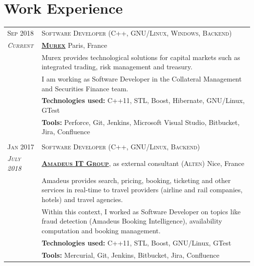 \documentclass[a4paper,10pt]{article}
\begin{document}
	\vspace{-5mm}

	\section{Work Experience}
	\begin{tabular}{p{1.7cm}|p{14.5cm}}
		\centering\textsc{Sep 2018} &
		\textsc{Software Developer (C++, GNU/Linux, Windows, Backend)} \\
		\centering\emph{\textsc{Current}} &
		\textsc{\textbf{\href{http://www.amadeus.com/}{Murex}}}  \hfill Paris, France\\
		& Murex provides technological solutions for capital markets such as integrated trading, risk management and treasury.\\
		& I am working as Software Developer in the Collateral Management and Securities Finance team.\\
		& \textbf{Technologies used:} C++11, STL, Boost, Hibernate, GNU/Linux, GTest\\
		& \textbf{Tools:} Perforce, Git, Jenkins, Microsoft Visual Studio, Bitbucket, Jira, Confluence\\
		
		\multicolumn{2}{c}{} \\
		\centering\textsc{Jan 2017} &
		\textsc{Software Developer (C++, GNU/Linux, Backend)} \\
		\centering\emph{\textsc{July 2018}} &
		\textsc{\textbf{\href{http://www.amadeus.com/}{Amadeus IT Group}}}, as external consultant (\textsc{Alten}) \hfill Nice, France\\
		& Amadeus provides search, pricing, booking, ticketing and other services in real-time to travel providers (airline and rail companies, hotels) and travel agencies.\\
		& Within this context, I worked as Software Developer on topics like fraud detection (Amadeus Booking Intelligence), availability computation and booking management.\\		
		& \textbf{Technologies used:} C++11, STL, Boost, GNU/Linux, GTest\\
		& \textbf{Tools:} Mercurial, Git, Jenkins, Bitbucket, Jira, Confluence\\


\end{tabular}
\end{document}
